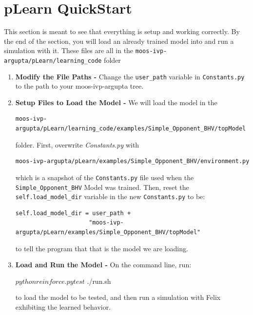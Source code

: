 \documentclass[onecolumn,letterpaper,11pt]{article}
\begin{document}
\section{pLearn QuickStart}
This section is meant to see that everything is setup and working correctly. By the end of the section, you will load an already trained model into  and run a simulation with it. These files are all in the \texttt{moos-ivp-argupta/pLearn/learning\_code} 
folder 
\begin{enumerate}
	\item \textbf{Modify the File Paths -} Change the \texttt{user\_path} variable in \texttt{Constants.py} to the path to your moos-ivp-argupta tree.  
	
	\item \textbf{Setup Files to Load the Model -} We will load the model in the
	
	\begin{verbatim} 
moos-ivp-argupta/pLearn/learning_code/examples/Simple_Opponent_BHV/topModel
	\end{verbatim}
	
	folder. First, overwrite \textit{Constants.py} with
	
	\begin{verbatim} 
moos-ivp-argupta/pLearn/examples/Simple_Opponent_BHV/environment.py
	\end{verbatim}

	\vspace{0.15in}
	 which is a snapshot of the \texttt{Constants.py} file used when the \texttt{Simple\_Opponent\_BHV} Model was trained. Then, reset the \texttt{self.load\_model\_dir} variable in the new \texttt{Constants.py} to be: 
	 
	 \begin{verbatim} 
self.load_model_dir = user_path + 
		      		 "moos-ivp-argupta/pLearn/examples/Simple_Opponent_BHV/topModel"
	 \end{verbatim}
 
	to tell the program that that is the model we are loading. 
	
	\item \textbf{Load and Run the Model -} On the command line, run:
	
	\vspace{0.15in}
	\begin{fileverb} 
$ python reinforce.py test
$ ./run.sh 
	\end{fileverb}
	\vspace{0.15in}
	
	to load the model to be tested, and then run a simulation with Felix exhibiting the learned behavior.
\end{enumerate} 
\end{document}
